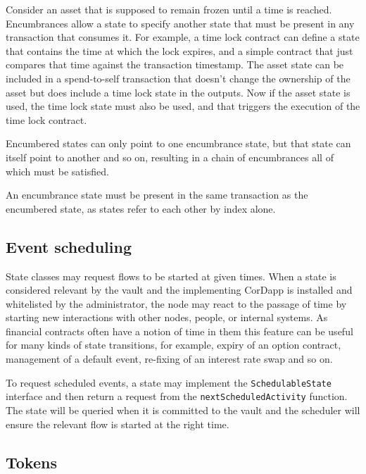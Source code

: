 \documentclass{article}
\begin{document}
Consider an asset that is supposed to remain frozen until a time is reached. Encumbrances allow a state to specify
another state that must be present in any transaction that consumes it. For example, a time lock contract can
define a state that contains the time at which the lock expires, and a simple contract that just compares that time
against the transaction timestamp. The asset state can be included in a spend-to-self transaction that doesn't
change the ownership of the asset but does include a time lock state in the outputs. Now if the asset state is
used, the time lock state must also be used, and that triggers the execution of the time lock contract.

Encumbered states can only point to one encumbrance state, but that state can itself point to another and so on,
resulting in a chain of encumbrances all of which must be satisfied.


An encumbrance state must be present in the same transaction as the encumbered state, as states refer to each other
by index alone.


\subsection{Event scheduling}\label{sec:event-scheduling}

State classes may request flows to be started at given times. When a state is considered relevant by the vault and
the implementing CorDapp is installed and whitelisted by the administrator, the node may react to the passage of
time by starting new interactions with other nodes, people, or internal systems. As financial contracts often have
a notion of time in them this feature can be useful for many kinds of state transitions, for example, expiry of an
option contract, management of a default event, re-fixing of an interest rate swap and so on.

To request scheduled events, a state may implement the \texttt{SchedulableState} interface and then return a
request from the \texttt{nextScheduledActivity} function. The state will be queried when it is committed to the
vault and the scheduler will ensure the relevant flow is started at the right time.

\subsection{Tokens}\label{sec:tokens}
\end{document}
